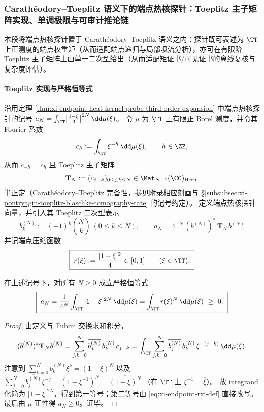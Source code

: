 \subsubsection{Carath\'eodory--Toeplitz 语义下的端点热核探针：Toeplitz 主子矩阵实现、单调极限与可审计推论链}\label{subsubsec:xi-endpoint-heat-kernel-probe-toeplitz}
本段将端点热核探针置于 Carath\'eodory--Toeplitz 语义之内：探针既可表述为 \(\TT\) 上正测度的端点权重矩（从而适配端点递归与局部喷流分析），亦可在有限阶 Toeplitz 主子矩阵上由单一二次型给出（从而适配矩证书/可见证书的离线复核与复杂度评估）。

\paragraph{Toeplitz 实现与严格恒等式}
沿用定理 \ref{thm:xi-endpoint-heat-kernel-probe-third-order-expansion} 中端点热核探针的记号 \(a_N=\int_{\TT}\bigl|\frac{1-\xi}{2}\bigr|^{2N}\,\dd\mu(\xi)\)。
令 \(\mu\) 为 \(\TT\) 上有限正 Borel 测度，并令其 Fourier 系数
\[
c_h:=\int_{\TT}\xi^{-h}\,\dd\mu(\xi),\qquad h\in\ZZ,
\]
从而 \(c_{-h}=\overline{c_h}\) 且 Toeplitz 主子矩阵
\[
\mathbf{T}_N:=(c_{j-k})_{0\le j,k\le N}\in\Mat_{N+1}(\CC)_{\mathrm{Herm}}
\]
半正定（Carath\'eodory--Toeplitz 完备性，参见附录相应刻画与 \S\ref{subsubsec:xi-pontryagin-toeplitz-blaschke-tomography-tate} 的记号约定）。
定义端点热核探针向量，并引入其 Toeplitz 二次型表示
\begin{equation}\label{eq:xi-endpoint-heat-probe-bN-aN}
\boxed{\;
b^{(N)}_k:=(-1)^k\binom{N}{k}\ (0\le k\le N),\qquad
a_N=4^{-N}\,(b^{(N)})^\ast\,\mathbf{T}_N\,b^{(N)}\;}
\end{equation}
并记端点压缩函数
\begin{equation}\label{eq:xi-endpoint-rxi-def}
\boxed{\;
r(\xi):=\frac{|1-\xi|^2}{4}\in[0,1]\qquad(\xi\in\TT).\;}
\end{equation}

\begin{proposition}\label{prop:xi-endpoint-heat-probe-toeplitz-herglotz-identity}
在上述记号下，对所有 \(N\ge 0\) 成立严格恒等式
\begin{equation}\label{eq:xi-endpoint-heat-probe-identity}
\boxed{\;
a_N
=\frac{1}{4^N}\int_{\TT}|1-\xi|^{2N}\,\dd\mu(\xi)
=\int_{\TT}r(\xi)^N\,\dd\mu(\xi)\ \ge\ 0.\;}
\end{equation}
\end{proposition}
\begin{proof}
由定义与 Fubini 交换求和积分，
\[
(b^{(N)})^\ast\mathbf{T}_N b^{(N)}
=\sum_{j,k=0}^{N}\overline{b_j^{(N)}}\,b_k^{(N)}\,c_{j-k}
=\int_{\TT}\sum_{j,k=0}^{N}\overline{b_j^{(N)}}\,b_k^{(N)}\,\xi^{-(j-k)}\,\dd\mu(\xi).
\]
注意到
\(
\sum_{k=0}^{N}b_k^{(N)}\xi^{k}=(1-\xi)^N
\)
以及
\(
\sum_{j=0}^{N}\overline{b_j^{(N)}}\xi^{-j}=(1-\xi^{-1})^N
=\overline{(1-\xi)^N}
\)
（在 \(\TT\) 上 \( \xi^{-1}=\overline{\xi}\)）。
故 integrand 化简为 \(|1-\xi|^{2N}\)，得到第一等号；第二等号由 \eqref{eq:xi-endpoint-rxi-def} 直接改写。
最后由 \(\mu\) 正性得 \(a_N\ge 0\)。证毕。
\end{proof}

